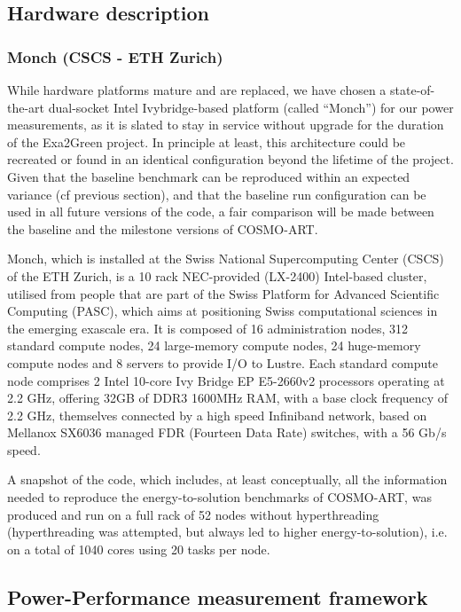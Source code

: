 \subsection{Hardware description}
\label{subsec:3.1}

\subsubsection{Monch (CSCS - ETH Zurich)}
While hardware  platforms mature  and are replaced,  we have  chosen a
state-of-the-art  dual-socket Intel  Ivybridge-based  platform (called
``Monch'')  for our power  measurements, as  it is  slated to  stay in
service without upgrade for the duration of the Exa2Green project.  In
principle at least,  this architecture could be recreated  or found in
an identical configuration beyond  the lifetime of the project.  Given
that  the baseline  benchmark  can be  reproduced  within an  expected
variance   (cf  previous   section),   and  that   the  baseline   run
configuration can be  used in all future versions of  the code, a fair
comparison  will  be  made  between  the baseline  and  the  milestone
versions of COSMO-ART.

Monch, which is installed  at the Swiss National Supercomputing Center
(CSCS)  of  the  ETH  Zurich,  is a  10  rack  NEC-provided  (LX-2400)
Intel-based cluster, utilised  from people that are part  of the Swiss
Platform  for  Advanced Scientific  Computing  (PASC),  which aims  at
positioning  Swiss  computational sciences  in  the emerging  exascale
era. It is  composed of 16 administration nodes,  312 standard compute
nodes, 24 large-memory compute nodes, 24 huge-memory compute nodes and
8  servers to  provide  I/O  to Lustre.   Each  standard compute  node
comprises 2 Intel 10-core Ivy Bridge EP E5-2660v2 processors operating
at  2.2 GHz,  offering 32GB  of DDR3  1600MHz RAM,  with a  base clock
frequency of 2.2 GHz, themselves  connected by a high speed Infiniband
network,  based on Mellanox  SX6036 managed  FDR (Fourteen  Data Rate)
switches, with a 56 Gb/s speed.

A snapshot of the code, which includes, at least conceptually, all the
information needed  to reproduce the  energy-to-solution benchmarks of
COSMO-ART, was  produced and run  on a full  rack of 52  nodes without
hyperthreading (hyperthreading was attempted, but always led to higher
energy-to-solution), i.e. on a total  of 1040 cores using 20 tasks per
node.

\subsection{Power-Performance measurement framework}
\label{subsec:3.2}

